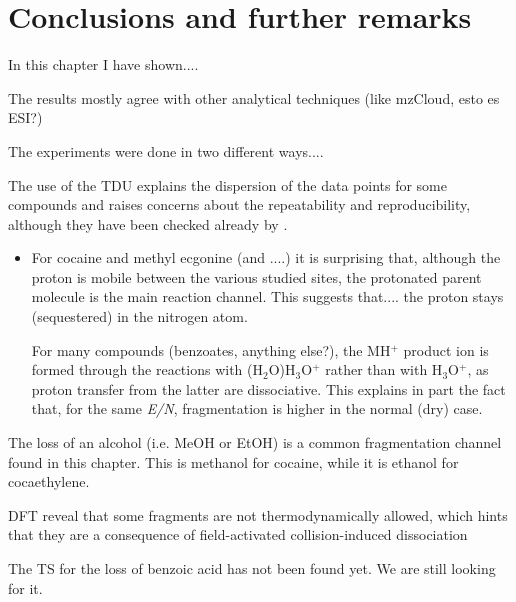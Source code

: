 \section{Conclusions and further remarks}
In this chapter I have shown....




The results mostly agree with other analytical techniques (like mzCloud, esto es ESI?)








The experiments were done in two different ways....

The use of the TDU explains the dispersion of the data points for some compounds and raises concerns about the repeatability  and reproducibility, although they have been checked already by \citeauthor{RN445} \cite{RN445}.


\begin{itemize}
\item For cocaine and methyl ecgonine (and ....) it is surprising that, although the proton is mobile between the various studied sites, the protonated parent molecule is the main reaction channel. 
This suggests that.... the proton stays (sequestered) in the nitrogen atom.


For many compounds (benzoates, anything else?), the MH$^+$ product ion is formed through the reactions with (H$_2$O)H$_3$O$^+$ rather than with H$_3$O$^+$, as proton transfer from the latter are dissociative. This explains in part the fact that, for the same \textit{E/N}, fragmentation is higher in the normal (dry) case.





\end{itemize}


The loss of an alcohol (i.e. MeOH or EtOH) is a common fragmentation channel found in this chapter.
This is methanol for cocaine, while it is ethanol for cocaethylene.

DFT reveal that some fragments are not thermodynamically allowed, which hints that they are a consequence of field-activated collision-induced dissociation

The TS for the loss of benzoic acid has not been found yet. We are still looking for it.


